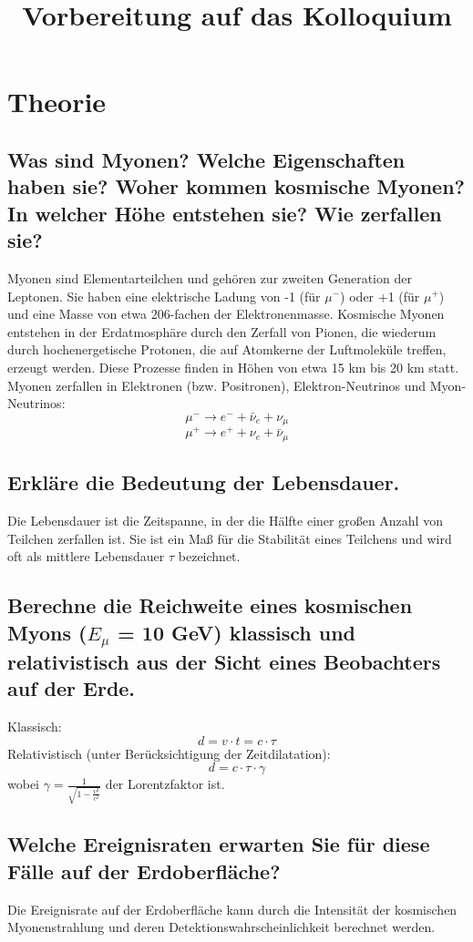 \documentclass[a4paper,12pt]{article}
\begin{document}
\title{Vorbereitung auf das Kolloquium}
\author{}
\date{}

\maketitle

\section{Theorie}

{\small
\subsection{Was sind Myonen? Welche Eigenschaften haben sie? Woher kommen kosmische Myonen? In welcher Höhe entstehen sie? Wie zerfallen sie?}
Myonen sind Elementarteilchen und gehören zur zweiten Generation der Leptonen. Sie haben eine elektrische Ladung von -1 (für $\mu^-$) oder +1 (für $\mu^+$) und eine Masse von etwa 206-fachen der Elektronenmasse. Kosmische Myonen entstehen in der Erdatmosphäre durch den Zerfall von Pionen, die wiederum durch hochenergetische Protonen, die auf Atomkerne der Luftmoleküle treffen, erzeugt werden. Diese Prozesse finden in Höhen von etwa 15 km bis 20 km statt. Myonen zerfallen in Elektronen (bzw. Positronen), Elektron-Neutrinos und Myon-Neutrinos:
$$\mu^- \rightarrow e^- + \bar{\nu}_e + \nu_\mu$$
$$\mu^+ \rightarrow e^+ + \nu_e + \bar{\nu}_\mu$$

\subsection{Erkläre die Bedeutung der Lebensdauer.}
Die Lebensdauer ist die Zeitspanne, in der die Hälfte einer großen Anzahl von Teilchen zerfallen ist. Sie ist ein Maß für die Stabilität eines Teilchens und wird oft als mittlere Lebensdauer $\tau$ bezeichnet.

\subsection{Berechne die Reichweite eines kosmischen Myons ($E_{\mu}$ = 10 GeV) klassisch und relativistisch aus der Sicht eines Beobachters auf der Erde.}
Klassisch:
$$d = v \cdot t = c \cdot \tau$$
Relativistisch (unter Berücksichtigung der Zeitdilatation):
$$d = c \cdot \tau \cdot \gamma$$
wobei $\gamma = \frac{1}{\sqrt{1 - \frac{v^2}{c^2}}}$ der Lorentzfaktor ist.

\subsection{Welche Ereignisraten erwarten Sie für diese Fälle auf der Erdoberfläche?}
Die Ereignisrate auf der Erdoberfläche kann durch die Intensität der kosmischen Myonenstrahlung und deren Detektionswahrscheinlichkeit berechnet werden.

}
\end{document}
